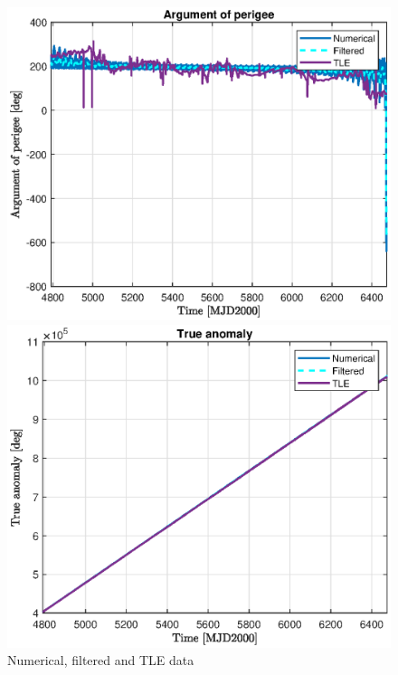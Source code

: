 \begin{figure}[H]
\begin{minipage}{0.48\linewidth}
		\includegraphics[width=\n\linewidth]{w_TLE.eps}
	\end{minipage}\hfill
	\begin{minipage}{0.48\linewidth}
		\centering
		\includegraphics[width=\n\linewidth]{TA_TLE.eps}
	\end{minipage}
	\caption{Numerical, filtered and TLE data}
	\label{fig:comparison_figures}
\end{figure}